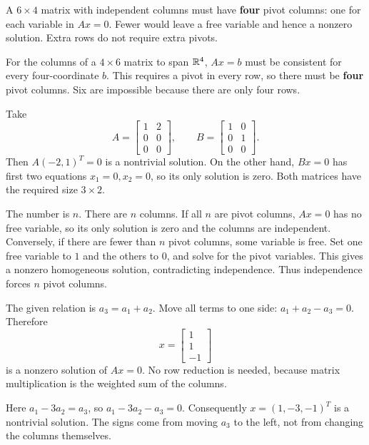 A $6\times4$ matrix with independent columns must have \textbf{four}
pivot columns: one for each variable in $Ax=0$. Fewer would leave a
free variable and hence a nonzero solution. Extra rows do not require extra pivots.

For the columns of a $4\times6$ matrix to span $\mathbb{R}^4$, $Ax=b$
must be consistent for every four-coordinate $b$. This requires a pivot
in every row, so there must be \textbf{four} pivot columns. Six are
impossible because there are only four rows.

Take
\[
 A=\begin{bmatrix}1&2\\0&0\\0&0\end{bmatrix},\qquad
 B=\begin{bmatrix}1&0\\0&1\\0&0\end{bmatrix}.
\]
Then $A(-2,1)^T=0$ is a nontrivial solution. On the other hand,
$Bx=0$ has first two equations $x_1=0,x_2=0$, so its only solution
is zero. Both matrices have the required size $3\times2$.

 The number is $\boxed{n}$.
There are $n$ columns. If all $n$ are pivot columns, $Ax=0$ has
no free variable, so its only solution is zero and the columns are independent.
Conversely, if there are fewer than $n$ pivot columns, some variable
is free. Set one free variable to $1$ and the others to $0$, and solve
for the pivot variables. This gives a nonzero homogeneous solution,
contradicting independence. Thus independence forces $n$ pivot columns.

The given relation is $a_3=a_1+a_2$. Move all terms to one side:
$a_1+a_2-a_3=0$. Therefore
\[
 x=\begin{bmatrix}1\\1\\-1\end{bmatrix}
\]
is a nonzero solution of $Ax=0$. No row reduction is needed, because
matrix multiplication is the weighted sum of the columns.

Here $a_1-3a_2=a_3$, so $a_1-3a_2-a_3=0$.
Consequently $x=(1,-3,-1)^T$ is a nontrivial solution. The signs
come from moving $a_3$ to the left, not from changing the columns themselves.


